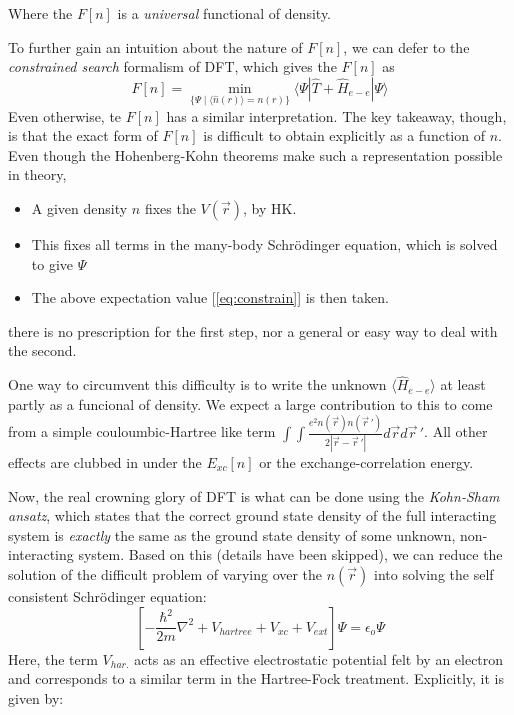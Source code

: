 \documentclass[]{article}
\begin{document}
        Where the $F[n]$ is a \textit{universal} functional of density.

        To further gain an intuition about the nature of $F[n]$, we can defer to
        the \textit{constrained search} formalism of DFT, which gives the $F[n]$ as
        \begin{equation}\label{eq:constrain}
          F[n] = \min_{\{\Psi \mid \langle\widehat{n}(r)\rangle = n(r)\}}
          \langle \Psi| \widehat{T} + \widehat{H}_{e-e} |\Psi\rangle
        \end{equation}
        Even otherwise, te $F[n]$ has a similar interpretation.
        The key takeaway, though, is that the exact form of $F[n]$ is difficult to obtain
        explicitly as a function of $n$. Even though the Hohenberg-Kohn theorems make
        such a representation possible in theory,
        \begin{itemize}
        \item A given density $n$ fixes the $V(\vec{r})$, by HK.
        \item This fixes all terms in the many-body Schr{\"o}dinger equation, which
          is solved to give $\Psi$
        \item The above expectation value [\ref{eq:constrain}] is then taken.
        \end{itemize}

        there is no prescription for the first step, nor a general or easy way to
        deal with the second.

        One way to circumvent this difficulty is to write the unknown
        $\langle \widehat{H}_{e-e} \rangle$ at least partly as a funcional of density. We
        expect a large contribution to this to come from a simple couloumbic-Hartree
        like term $\int \int \frac{e^2 n(\vec{r}) n({\vec{r}\,}') }{2 |\vec{r}
          - {\vec{r}\,}'|} d\vec{r} d{\vec{r}\,}'$. All other effects are clubbed in under the $E_{xc}[n]$
        or the exchange-correlation energy.

        Now, the real crowning glory of DFT is what can be done using the
        \textit{Kohn-Sham ansatz}, which states that the correct ground state
        density of the full interacting system is \textit{exactly} the same as the
        ground state density of some unknown, non-interacting system. Based on this
        (details have been skipped), we can reduce the solution of the difficult problem
        of varying over the $ n(\vec{r}) $ into solving the self consistent Schr{\"o}dinger
        equation:
        \begin{equation}\label{eq:dft_schrod}
                [-\frac{\hbar^2}{2m}\nabla^2 + V_{hartree} + V_{xc} + V_{ext}]\Psi = \epsilon_o \Psi
        \end{equation}
        Here, the term $ V_{har.} $ acts as an effective electrostatic potential felt
        by an electron and corresponds to a similar term in the Hartree-Fock treatment.
        Explicitly, it is given by:
\end{document}
